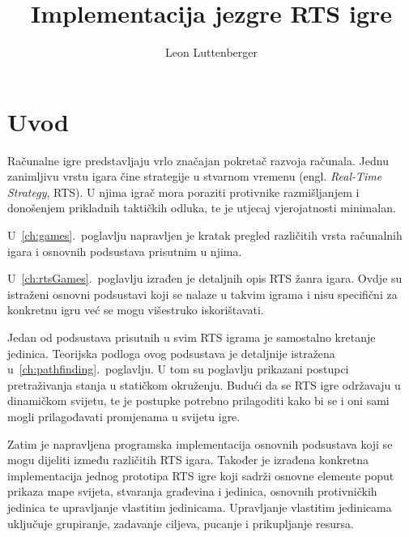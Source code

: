 \documentclass[times, utf8, zavrsni, numeric]{fer}
\begin{document}

\title{Implementacija jezgre RTS igre}

\author{Leon Luttenberger}

\maketitle

\izvornik{}

\zahvala{}

\tableofcontents

\chapter{Uvod}

\par Računalne igre predstavljaju vrlo značajan pokretač razvoja računala.
Jednu zanimljivu vrstu igara čine strategije u stvarnom vremenu (engl. \textit{Real-Time Strategy}, RTS).
U njima igrač mora poraziti protivnike razmišljanjem i donošenjem prikladnih taktičkih odluka, te je utjecaj vjerojatnosti minimalan.

\par U~\ref{ch:games}.~poglavlju napravljen je kratak pregled različitih vrsta računalnih igara i osnovnih podsustava prisutnim u njima.

\par U~\ref{ch:rtsGames}.~poglavlju izrađen je detaljnih opis RTS žanra igara.
Ovdje su istraženi osnovni podsustavi koji se nalaze u takvim igrama i nisu specifični za konkretnu igru već se mogu višestruko iskorištavati.

\par Jedan od podsustava prisutnih u svim RTS igrama je samostalno kretanje jedinica. 
Teorijska podloga ovog podsustava je detaljnije istražena u~\ref{ch:pathfinding}.~poglavlju.
U tom su poglavlju prikazani postupci pretraživanja stanja u statičkom okruženju.
Budući da se RTS igre održavaju u dinamičkom svijetu, te je postupke potrebno prilagoditi kako bi se i oni sami mogli prilagođavati promjenama u svijetu igre.

\par Zatim je napravljena programska implementacija osnovnih podsustava koji se mogu dijeliti između različitih RTS igara.
Također je izrađena konkretna implementacija jednog prototipa RTS igre koji sadrži osnovne elemente poput prikaza mape svijeta, stvaranja građevina i jedinica, osnovnih protivničkih jedinica te upravljanje vlastitim jedinicama.
Upravljanje vlastitim jedinicama uključuje grupiranje, zadavanje ciljeva, pucanje i prikupljanje resursa.
\end{document}
